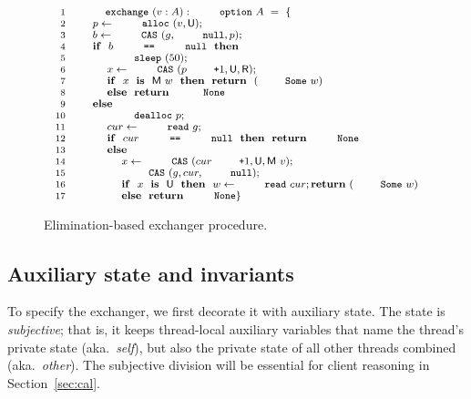 {
\setlength{\belowcaptionskip}{-10pt} 
\begin{figure}
\centering
\[
{\small{
\begin{array}{rl}
 \Num{1} & \esc{exchange}~(v : A) : \esc{option}~A~=~\{ 
\\ 
 \Num{2} & ~~~~ p \Asgn \esc{alloc}~(v, \Unmatched);\\
 \Num{3} & ~~~~ b \Asgn \esc{CAS}~(g, \esc{null}, p);\\
 \Num{4} & ~~~~ \kw{if}~~b~\esc{==}~\esc{null}~~\kw{then}\\
 \Num{5} & ~~~~ ~~~~ \esc{sleep}~(50);\\
 \Num{6} & ~~~~ ~~~~ x \Asgn \esc{CAS}~(p\esc{+}1, \Unmatched, \Retired);\\
 \Num{7} & ~~~~ ~~~~ \kw{if}~~x~~\kw{is}~~\Matched w~~\kw{then}~~\kw{return}~~(\esc{Some}~w)\\
 \Num{8} & ~~~~ ~~~~ \kw{else}~~\kw{return}~~\esc{None}\\
 \Num{9} & ~~~~ \kw{else}\\
\Num{10} & ~~~~ ~~~~ \esc{dealloc}~p;\\
\Num{11} & ~~~~ ~~~~ cur \Asgn \esc{read}~g;\\
\Num{12} & ~~~~ ~~~~ \kw{if}~~cur~\esc{==}~\esc{null}~~\kw{then}~~\kw{return}~{\esc{None}}\\
\Num{13} & ~~~~ ~~~~ \kw{else}\\
\Num{14} & ~~~~ ~~~~ ~~~~ x \Asgn \esc{CAS}~(cur\esc{+}1, \Unmatched, \Matched v);\\
\Num{15} & ~~~~ ~~~~ ~~~~ \esc{CAS}~(g, cur, \esc{null});\\
\Num{16} & ~~~~ ~~~~ ~~~~ \kw{if}~~x~~\kw{is}~~\Unmatched~~\kw{then}~~w\Asgn \esc{read}~cur;\kw{return}~(\esc{Some}\ w)\\
\Num{17} & ~~~~ ~~~~ ~~~~ \kw{else}~~\kw{return}~\esc{None}\}
\end{array}
}}
\]
\vspace{-5pt}  
\caption{Elimination-based exchanger procedure.}
\label{fig:exchanger}
\vspace{-10pt}  
\end{figure} 
}


\subsection{Auxiliary state and invariants}

To specify the exchanger, we first decorate it with auxiliary
state. The state is \emph{subjective}; that is, it keeps thread-local
auxiliary variables that name the thread's private state
(aka.~\emph{self}), but also the private state of all other threads
combined (aka.~\emph{other}).  The subjective division will be
essential for client reasoning in Section~\ref{sec:cal}.
%
%

